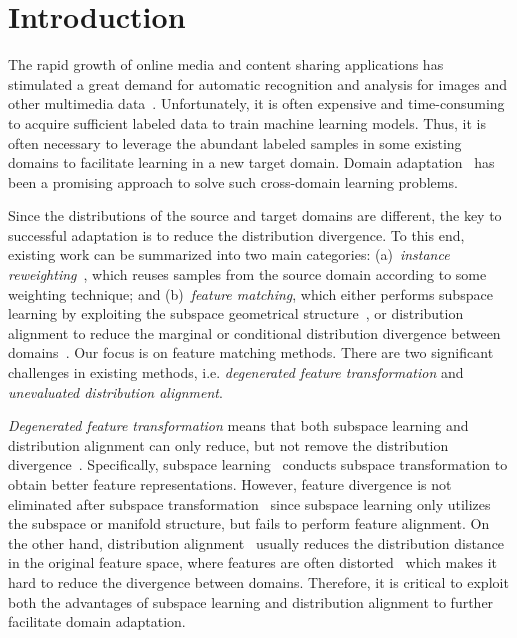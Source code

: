 \documentclass[sigconf]{acmart}
\begin{document}


\maketitle

\section{Introduction}

The rapid growth of online media and content sharing applications has stimulated a great demand for automatic recognition and analysis for images and other multimedia data~\cite{ionescu2018datasets,chen2018zero}. Unfortunately, it is often expensive and time-consuming to acquire sufficient labeled data to train machine learning models. Thus, it is often necessary to leverage the abundant labeled samples in some existing domains to facilitate learning in a new target domain. Domain adaptation~\cite{pan2010survey,transferlearning} has been a promising approach to solve such cross-domain learning problems. 

Since the distributions of the source and target domains are different, the key to successful adaptation is to reduce the distribution divergence. To this end, existing work can be summarized into two main categories: (a)~\textit{instance reweighting}~\cite{dai2007boosting,xu2017unified}, which reuses samples from the source domain according to some weighting technique; and (b)~\textit{feature matching}, which either performs subspace learning by exploiting the subspace geometrical structure~\cite{fernando2013unsupervised,sun2016return,gong2012geodesic}, or distribution alignment to reduce the marginal or conditional distribution divergence between domains~\cite{zhang2017joint,long2013transfer}. Our focus is on feature matching methods. There are two significant challenges in existing methods, i.e. \textit{degenerated feature transformation} and \textit{unevaluated distribution alignment}. 

\textit{Degenerated feature transformation} means that both subspace learning and distribution alignment can only reduce, but not remove the distribution divergence~\cite{aljundi2015landmarks}. Specifically, subspace learning~\cite{gong2012geodesic,sun2016return,fernando2013unsupervised} conducts subspace transformation to obtain better feature representations. However, feature divergence is not eliminated after subspace transformation~\cite{long2014adaptation} since subspace learning only utilizes the subspace or manifold structure, but fails to perform feature alignment. On the other hand, distribution alignment~\cite{pan2011domain,long2013transfer,wang2017balanced} usually reduces the distribution distance in the original feature space, where features are often distorted~\cite{baktashmotlagh2013unsupervised} which makes it hard to reduce the divergence between domains. Therefore, it is critical to exploit both the advantages of subspace learning and distribution alignment to further facilitate domain adaptation.
\end{document}
